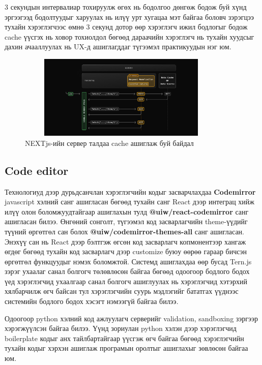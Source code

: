 3 секундын интервалиар тохируулж өгөх нь бодолгоо дөнгөж бодож буй хүнд эргээгээд бодолтуудыг харуулах нь илүү урт хугацаа мэт байгаа боловч зэрэгцээ тухайн хэрэглэгчээс өмнө 3 секунд дотор өөр хэрэглэгч ижил бодлогыг бодож cache үүсгэх нь ховор тохиолдол бөгөөд дараачийн хэрэглэгч нь тухайн хуудсыг дахин ачааллуулах нь UX-д ашиглагддаг түгээмэл практикуудын нэг юм.

\begin{figure}[H]
  \centering
  \includegraphics[width=10cm, height=4cm]{img/request-memo.png}
  \caption{NEXTjs-ийн сервер талдаа cache ашиглаж буй байдал}
\end{figure}
\clearpage

\subsection{Code editor}
Технологиуд дээр дурьдсанчлан хэрэглэгчийн кодыг засварчлахдаа \textbf{Codemirror} javascript хэлний санг ашигласан бөгөөд тухайн санг React дээр интеграц хийж илүү олон боломжуудтайгаар ашиглахын тулд \textbf{@uiw/react-codemirror} санг ашигласан билээ. Өнгөний сонголт, түгээмэл код засварлагчийн theme-үүдийг түүний өргөтгөл сан болох \textbf{@uiw/codemirror-themes-all} санг ашигласан. Энэхүү сан нь React дээр бэлтгэж өгсөн код засварлагч копмонентээр хангаж өгдөг бөгөөд тухайн код засварлагч дээр customize буюу өөрөө гараар бичсэн өргөтгөл функцуудыг нэмэх боломжтой. Системд ашиглахдаа өөр бусад Tern.js зэрэг ухаалаг санал болгогч төлөвлөсөн байгаа бөгөөд одоогоор бодлого бодох үед хэрэглэгчид ухаалгаар санал болгогч ашиглуулах нь хэрэглэгчид хэтэрхий хялбарчилж өгч байсан тул хэрэглэгчийн суурь мэдлэгийг бататгах үүднээс системийн бодлого бодох хэсэгт нэмээгүй байгаа билээ.

Одоогоор python хэлний код ажлуулагч серверийг validation, sandboxing зэргээр хэрэгжүүлсэн байгаа билээ. Үүнд зориулан python хэлэн дээр хэрэглэгчид boilerplate кодыг анх тайлбартайгаар үүсгэж өгч байгаа бөгөөд хэрэглэгчийн тухайн кодыг хэрхэн ашиглаж програмын оролтыг ашиглахыг зөвлөсөн байгаа юм. 


